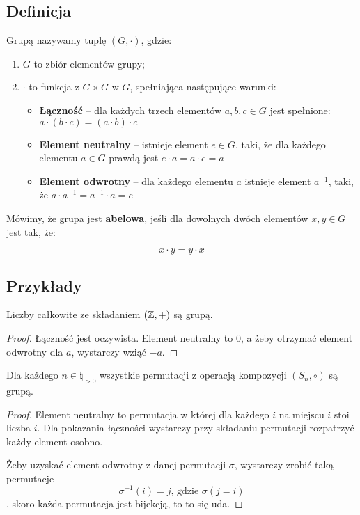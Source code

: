 \subsection{Definicja}
\begin{definition}
Grupą nazywamy tuplę \((G, \cdot)\), gdzie:

\begin{enumerate}
    \item \(G\) to zbiór elementów grupy;
    \item \(\cdot\) to funkcja z \(G \times G\) w \(G\), spełniająca następujące warunki:
    \begin{itemize}
    \item \textbf{Łączność} -- dla każdych trzech elementów \(a, b, c \in G\) jest spełnione: \(a\cdot(b\cdot c) = (a\cdot b)\cdot c\)
    \item \textbf{Element neutralny} -- istnieje element \(e \in G\), taki, że dla każdego elementu \(a \in G\) prawdą jest \(e\cdot a = a\cdot e = a\)
    \item \textbf{Element odwrotny} -- dla każdego elementu \(a\) istnieje element \(a^{-1}\), taki, że \(a \cdot a^{-1} = a^{-1} \cdot a = e\)
\end{itemize}
\end{enumerate}

\end{definition}

\begin{definition}
Mówimy, że grupa jest \textbf{abelowa}, jeśli dla dowolnych dwóch elementów \(x, y \in G\) jest tak, że:

\[ 
    x \cdot y = y \cdot x
\]
\end{definition}

\subsection{Przykłady}
\begin{lemma}
    Liczby całkowite ze składaniem \((\mathbb{Z}, +)\) są grupą.
\end{lemma}
\begin{proof}
    Łączność jest oczywista. Element neutralny to \(0\), a żeby otrzymać element odwrotny dla \(a\), wystarczy wziąć \(-a\).
\end{proof}

\begin{lemma}
    Dla każdego \(n \in \natural_{>0}\) wszystkie permutacji z operacją kompozycji \((S_n, \circ)\) są grupą.
\end{lemma}
\begin{proof}
    Element neutralny to permutacja w której dla każdego \(i\) na miejscu \(i\) stoi liczba \(i\). Dla pokazania łączności wystarczy przy składaniu permutacji rozpatrzyć każdy element osobno.
    
    Żeby uzyskać element odwrotny z danej permutacji \(\sigma\), wystarczy zrobić taką permutacje \[
    \sigma^{-1}(i) = j\text{, gdzie } \sigma(j = i)
    \],
    skoro każda permutacja jest bijekcją, to to się uda.
\end{proof}

